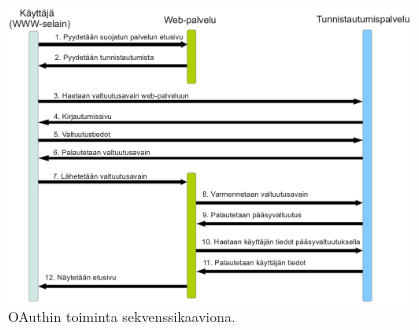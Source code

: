 \begin{figure}[ht]
\centering
\includegraphics[width=0.95\textwidth]{teknologiat/protokollat/oauth.eps}
\caption{OAuthin toiminta sekvenssikaaviona.}%
\label{oauth}
\end{figure}
